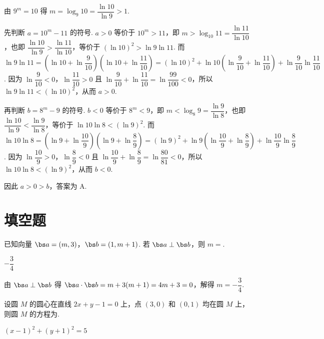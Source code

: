 \begin{solution}
由 \(9^m=10\) 得 \(m=\log_{9}10=\dfrac{\ln10}{\ln9}>1\).

先判断 \(a=10^m-11\) 的符号. \(a>0\) 等价于 \(10^m>11\)，即 \(m>\log_{10}11=\dfrac{\ln11}{\ln10}\)，也即 \(\dfrac{\ln10}{\ln9}>\dfrac{\ln11}{\ln10}\)，等价于 \((\ln10)^2>\ln9\ln11\). 而 \(\ln9\ln11=\left(\ln10+\ln\dfrac9{10}\right)\left(\ln10+\ln\dfrac{11}{10}\right)=(\ln10)^2+\ln10\left(\ln\dfrac9{10}+\ln\dfrac{11}{10}\right)+\ln\dfrac9{10}\ln\dfrac{11}{10}\). 因为 \(\ln\dfrac9{10}<0\)，\(\ln\dfrac{11}{10}>0\) 且 \(\ln\dfrac9{10}+\ln\dfrac{11}{10}=\ln\dfrac{99}{100}<0\)，所以 \(\ln9\ln11<(\ln10)^2\)，从而 \(a>0\).

再判断 \(b=8^m-9\) 的符号. \(b<0\) 等价于 \(8^m<9\)，即 \(m<\log_8 9=\dfrac{\ln9}{\ln8}\)，也即 \(\dfrac{\ln10}{\ln9}<\dfrac{\ln9}{\ln8}\)，等价于 \(\ln10\ln8<(\ln9)^2\). 而 \(\ln10\ln8=\left(\ln9+\ln\dfrac{10}{9}\right)\left(\ln9+\ln\dfrac89\right)=(\ln9)^2+\ln9\left(\ln\dfrac{10}{9}+\ln\dfrac89\right)+\ln\dfrac{10}{9}\ln\dfrac89\). 因为 \(\ln\dfrac{10}{9}>0\)，\(\ln\dfrac89<0\) 且 \(\ln\dfrac{10}{9}+\ln\dfrac89=\ln\dfrac{80}{81}<0\)，所以 \(\ln10\ln8<(\ln9)^2\)，从而 \(b<0\).

因此 \(a>0>b\)，答案为 A.
\end{solution}

\section{填空题}

\begin{problem}
已知向量 \(\bs a=\left(m,3\right)\)，\(\bs b=\left(1,m+1\right)\). 若 \(\bs a\perp\bs b\)，则 \(m=\)\fillinblank{}.
\end{problem}

\begin{answer}
\(-\dfrac{3}{4}\)
\end{answer}

\begin{solution}
由 \(\bs a\perp\bs b\) 得 \(\bs a\cdot\bs b=m+3(m+1)=4m+3=0\)，解得 \(m=-\dfrac34\).
\end{solution}

\begin{problem}
设圆 \(M\) 的圆心在直线 \(2x+y-1=0\) 上，点 \(\left(3,0\right)\) 和 \(\left(0,1\right)\) 均在圆 \(M\) 上，则圆 \(M\) 的方程为\fillinblank{}.
\end{problem}

\begin{answer}
\((x-1)^2+(y+1)^2=5\)
\end{answer}


